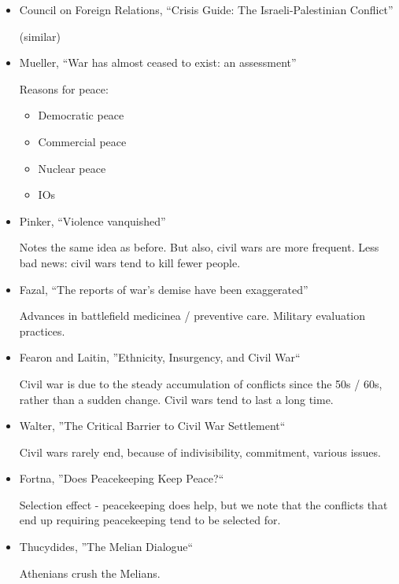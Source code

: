 \documentclass{article}
\begin{document}
\begin{itemize}
    \item Council on Foreign Relations, ``Crisis Guide: The Israeli-Palestinian Conflict''

      (similar)

    \item Mueller, ``War has almost ceased to exist: an assessment''

      Reasons for peace:

      \begin{itemize}
        \item Democratic peace
        \item Commercial peace
        \item Nuclear peace
        \item IOs
      \end{itemize}

    \item Pinker, ``Violence vanquished''

      Notes the same idea as before.  But also, civil wars are more frequent.  Less bad news: civil wars tend to kill fewer people.

    \item Fazal, ``The reports of war's demise have been exaggerated''
      
      Advances in battlefield medicinea / preventive care.  Military evaluation practices.

    \item Fearon and Laitin, ''Ethnicity, Insurgency, and Civil War``

      Civil war is due to the steady accumulation of conflicts since the 50s / 60s, rather than a sudden change.  Civil wars tend to last a long time.

    \item Walter, ''The Critical Barrier to Civil War Settlement``

      Civil wars rarely end, because of indivisibility, commitment, various issues. 

    \item Fortna, ''Does Peacekeeping Keep Peace?``

      Selection effect - peacekeeping does help, but we note that the conflicts that end up requiring peacekeeping tend to be selected for.

    \item Thucydides, ''The Melian Dialogue``

      Athenians crush the Melians.


\end{itemize}
\end{document}
